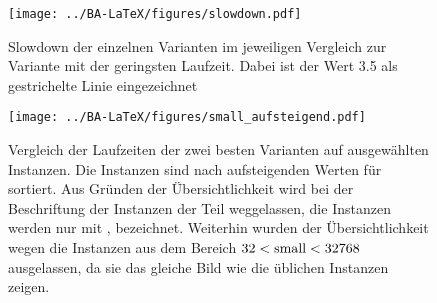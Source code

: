  
\begin{figure}[H]
\centering
	\texttt{[image: ../BA-LaTeX/figures/slowdown.pdf]}
	\caption[Slowdown der einzelnen Varianten im jeweiligen Vergleich zur Variante mit der geringsten Laufzeit.]
	{Slowdown der einzelnen Varianten im jeweiligen Vergleich zur Variante mit der geringsten Laufzeit. 
	Dabei ist der Wert 3.5 als gestrichelte Linie eingezeichnet}
	\label{fig:messung_slowdown}
\end{figure}


\begin{figure}[H]
\centering
	\texttt{[image: ../BA-LaTeX/figures/small\_aufsteigend.pdf]}
	\caption[Laufzeitvergleich der zwei besten Varianten auf ausgewählten Instanzen] {Vergleich der Laufzeiten der zwei besten Varianten auf ausgewählten Instanzen.
			Die Instanzen sind nach aufsteigenden Werten für \sm{} sortiert. Aus Gründen der Übersichtlichkeit
wird bei  der Beschriftung der Instanzen der Teil \fr{} weggelassen, die Instanzen werden 
nur mit \la{}, \sm{} bezeichnet. Weiterhin wurden der
Übersichtlichkeit wegen die Instanzen aus dem Bereich $32 < \text{small}  <32768$ ausgelassen, da sie das gleiche
Bild wie die üblichen Instanzen zeigen.}
	\label{fig:messung_small}
\end{figure}
